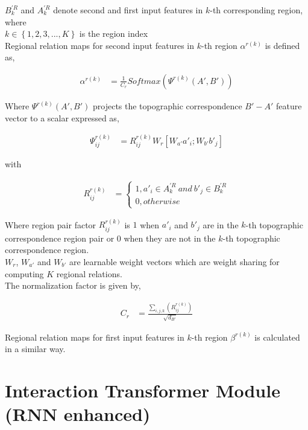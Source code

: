 \documentclass{article}
\begin{document}
\noindent $B_{k}^{'R}$ and $A_{k}^{'R}$ denote second and first input features in $k$-th corresponding region, \\

where \\

\indent\indent $k \in \left\{1, 2, 3, ..., K\right\}$ is the region index \\

\noindent Regional relation maps for second input features in $k$-th region $\alpha^{r(k)}$ is defined as,

\begin{align}
\alpha^{r(k)} &= \frac{1}{C_{r}}Softmax\left(\Psi^{r(k)}(A', B')\right)
\end{align}

\noindent Where $\Psi^{r(k)}(A', B')$ projects the topographic correspondence $B'-A'$ feature vector to a scalar expressed as,

\begin{align}
\Psi_{ij}^{r(k)} &= R_{ij}^{r(k)}W_{r}[W_{a'}a'_{i}; W_{b'}b'_{j}] 
\end{align}

with

\begin{align}
R_{ij}^{r(k)} &= \begin{cases} %
		1, a'_{i} \in A_{k}^{'R}\: and\: b'_{j} \in B_{k}^{'R} \\ 
		0, otherwise
	\end{cases} 
\end{align}

\noindent Where region pair factor $R_{ij}^{r(k)}$ is $1$ when $a'_{i}$ and $b'_{j}$ are in the $k$-th topographic correspondence region pair or $0$ when they are not in the $k$-th topographic correspondence region. \\
\noindent $W_{r}$, $W_{a'}$ and $W_{b'}$ are learnable weight vectors which are weight sharing for computing $K$ regional relations. \\

\noindent The normalization factor is given by,

\begin{align}
C_{r} &= \frac{\sum_{i, j, k}\left(R_{ij}^{r(k)}\right)}{\sqrt{d_{B'}}}
\end{align}

\noindent Regional relation maps for first input features in $k$-th region $\beta^{r(k)}$ is calculated in a similar way.

\section{Interaction Transformer Module (RNN enhanced)}
 
\end{document}
